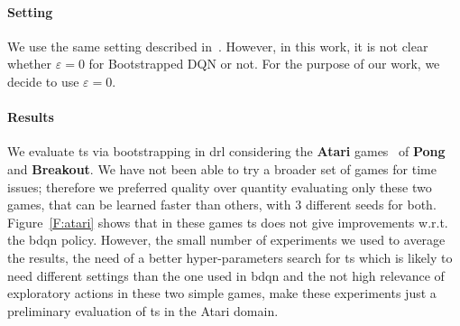 \paragraph{Setting} We use the same setting described in~\cite{osband2017deep}. However, in this work, it is not clear whether $\varepsilon = 0$ for Bootstrapped DQN or not. For the purpose of our work, we decide to use $\varepsilon = 0$.
\paragraph{Results} We evaluate \gls{ts} via bootstrapping in \gls{drl} considering the \textbf{Atari} games~\cite{bellemare13arcade} of \textbf{Pong} and \textbf{Breakout}. 
We have not been able to try a broader set of games for time issues; therefore we preferred quality over quantity evaluating only these two games, that can be learned faster than others, with $3$ different seeds for both. Figure~\ref{F:atari} shows that in these games \gls{ts} does not give improvements w.r.t. the \gls{bdqn} policy. However, the small number of experiments we used to average the results, the need of a better hyper-parameters search for \gls{ts} which is likely to need different settings than the one used in \gls{bdqn} and the not high relevance of exploratory actions in these two simple games, make these experiments just a preliminary evaluation of \gls{ts} in the Atari domain.
